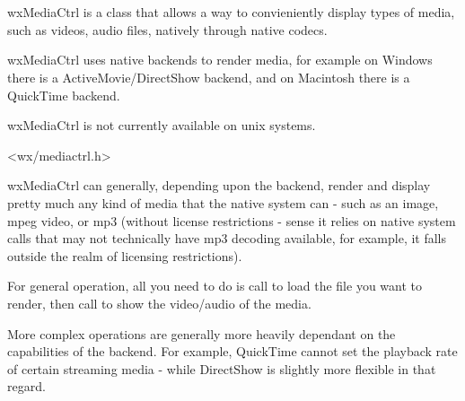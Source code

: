 
\section{}\label{wxmediactrl}

wxMediaCtrl is a class that allows a way to convieniently display types of 
media, such as videos, audio files, natively through native codecs.

wxMediaCtrl uses native backends to render media, for example on Windows
there is a ActiveMovie/DirectShow backend, and on Macintosh there is a 
QuickTime backend.

wxMediaCtrl is not currently available on unix systems. 




<wx/mediactrl.h>


\label{renderingmediawxmediactrl}

wxMediaCtrl can generally, depending upon the backend, render
and display pretty much any kind of media that the native system can - 
such as an image, mpeg video, or mp3 (without license restrictions -
sense it relies on native system calls that may not technically
have mp3 decoding available, for example, it falls outside the
realm of licensing restrictions).

For general operation, all you need to do is call 
 to load the file
you want to render, then call  
to show the video/audio of the media.

More complex operations are generally more heavily dependant on the
capabilities of the backend.  For example, QuickTime cannot set
the playback rate of certain streaming media - while DirectShow is 
slightly more flexible in that regard.

\label{operationwxmediactrl}


